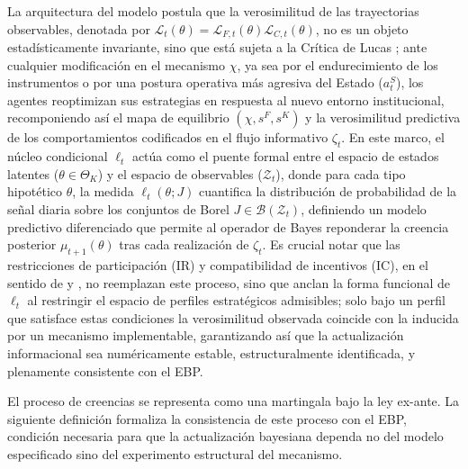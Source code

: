 \documentclass[pdflatex,sn-mathphys-ay]{sn-jnl}
\theoremstyle{thmstyleone}
\theoremstyle{thmstyletwo}
\theoremstyle{thmstylethree}
\newcommand{\ThetaK}{\Theta_K}
\newcommand{\1}{\mathbf{1}}
\begin{document}
La arquitectura del modelo postula que la verosimilitud de las trayectorias observables, denotada por $\mathcal{L}_t(\theta)=\mathcal{L}_{F,t}(\theta)\mathcal{L}_{C,t}(\theta)$, no es un objeto estadísticamente invariante, sino que está sujeta a la Crítica de Lucas \citeyearpar{Lucas1976}; ante cualquier modificación en el mecanismo $\chi$, ya sea por el endurecimiento de los instrumentos o por una postura operativa más agresiva del Estado ($a_t^S$), los agentes reoptimizan sus estrategias en respuesta al nuevo entorno institucional, recomponiendo así el mapa de equilibrio $(\chi, s^F, s^K)$ y la verosimilitud predictiva de los comportamientos codificados en el flujo informativo $\zeta_t$. En este marco, el núcleo condicional $\ell_t$ actúa como el puente formal entre el espacio de estados latentes ($\theta \in \ThetaK$) y el espacio de observables ($\mathcal{Z}_t$), donde para cada tipo hipotético $\theta$, la medida $\ell_t(\theta; J)$ cuantifica la distribución de probabilidad de la señal diaria sobre los conjuntos de Borel $J \in \mathcal{B}(\mathcal{Z}_t)$, definiendo un modelo predictivo diferenciado que permite al operador de Bayes reponderar la creencia posterior $\mu_{t+1}(\theta)$ tras cada realización de $\zeta_t$. Es crucial notar que las restricciones de participación (IR) y compatibilidad de incentivos (IC), en el sentido de \citet{Myerson1979IC} y \citet{BoltonDewatripont2005}, no reemplazan este proceso, sino que anclan la forma funcional de $\ell_t$ al restringir el espacio de perfiles estratégicos admisibles; solo bajo un perfil que satisface estas condiciones la verosimilitud observada coincide con la inducida por un mecanismo implementable, garantizando así que la actualización informacional sea numéricamente estable, estructuralmente identificada, y plenamente consistente con el EBP.

El proceso de creencias se representa como una martingala bajo la ley ex-ante. La siguiente definición formaliza la consistencia de este proceso con el EBP, condición necesaria para que la actualización bayesiana dependa no del modelo especificado sino del experimento estructural del mecanismo.
\end{document}
